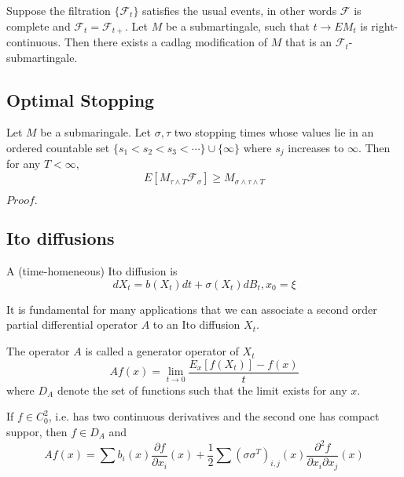 \documentclass{article}
\newcommand{\Pf}[1]{$Proof.$\par}
\newcommand{\F}{\mathcal{F}}
\begin{document}
\begin{proposition}
    Suppose the filtration $\{\F_t\}$ satisfies the usual events, in other words $\F$ is complete and $\F_t = \F_{t+}$. Let $M$ be a submartingale, such that $t\to EM_t$ is right-continuous. Then there exists a cadlag modification of $M$ that is an $\F_t$-submartingale.
\end{proposition}

\subsection{Optimal Stopping}

\begin{lemma}
    Let $M$ be a submaringale. Let $\sigma, \tau$ two stopping times whose values lie in an ordered countable set $\{s_1<s_2<s_3<\cdots\}\cup\{\infty\}$ where $s_j$ increases to $\infty$. Then for any $T<\infty$,
    \[E[M_{\tau\wedge T}\F_{\sigma}] \geq M_{\sigma \wedge \tau \wedge T}\]
\end{lemma}
\Pf\par
 \newpage

\subsection{Ito diffusions}

\begin{definition}
    A (time-homeneous) Ito diffusion is
    \[dX_t = b(X_t)dt+\sigma(X_t)dB_t, x_0 = \xi\]
\end{definition}

It is fundamental for many applications that we can associate a second order partial differential operator $A$ to an Ito diffusion $X_t$. 

\begin{definition}
    The operator $A$ is called a generator operator of $X_t$
    \[Af(x) = \lim_{t\to 0} \dfrac{E_x[f(X_t)]-f(x)}{t}\]
    where $D_A$ denote the set of functions such that the limit exists for any $x$.
\end{definition}

\begin{lemma}
    If $f\in C_0^2$, i.e. has two continuous derivatives and the second one has compact suppor, then $f\in D_A$ and \[Af(x) = \sum b_i(x) \dfrac{\partial f}{\partial x_i}(x) + \dfrac{1}{2} \sum(\sigma\sigma^T)_{i,j}(x)\dfrac{\partial^2 f}{\partial x_i\partial x_j}(x)\]
\end{lemma}





\end{document}
